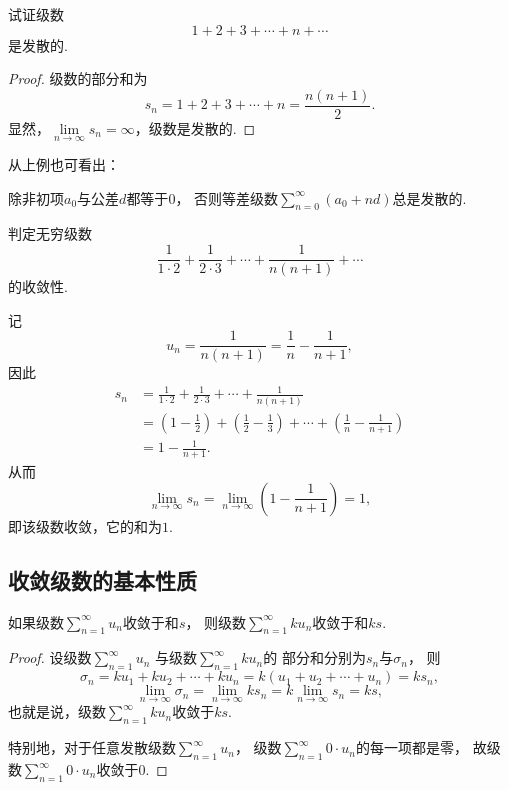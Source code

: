 \begin{example}\label{example:无穷级数.等差级数的收敛性}
试证级数\[
1+2+3+\dotsb+n+\dotsb
\]是发散的.
\begin{proof}
级数的部分和为\[
s_n = 1+2+3+\dotsb+n = \frac{n(n+1)}{2}.
\]显然，\(\lim\limits_{n\to\infty} s_n=\infty\)，级数是发散的.
\end{proof}
\end{example}
从上例也可看出：
\begin{proposition}
除非初项\(a_0\)与公差\(d\)都等于\(0\)，
否则等差级数\(\sum\limits_{n=0}^\infty(a_0+nd)\)总是发散的.
\end{proposition}

\begin{example}
判定无穷级数\[
\frac{1}{1\cdot2}+\frac{1}{2\cdot3}+\dotsb+\frac{1}{n(n+1)}+\dotsb
\]的收敛性.
\begin{solution}
记\[
	u_n = \frac{1}{n(n+1)} = \frac{1}{n}-\frac{1}{n+1},
\]
因此\begin{align*}
	s_n &= \frac{1}{1\cdot2}+\frac{1}{2\cdot3}+\dotsb+\frac{1}{n(n+1)} \\
	&= \left(1-\frac{1}{2}\right)+\left(\frac{1}{2}-\frac{1}{3}\right)
	+\dotsb+\left(\frac{1}{n}-\frac{1}{n+1}\right) \\
	&= 1-\frac{1}{n+1}.
\end{align*}
从而\[
	\lim\limits_{n\to\infty} s_n = \lim\limits_{n\to\infty} \left(1-\frac{1}{n+1}\right) = 1,
\]
即该级数收敛，它的和为\(1\).
\end{solution}
\end{example}

\subsection{收敛级数的基本性质}
\begin{property}\label{theorem:无穷级数.收敛级数性质1}
如果级数\(\sum\limits_{n=1}^\infty u_n\)收敛于和\(s\)，
则级数\(\sum\limits_{n=1}^\infty k u_n\)收敛于和\(ks\).
\begin{proof}
设级数\(\sum\limits_{n=1}^\infty u_n\)
与级数\(\sum\limits_{n=1}^\infty k u_n\)的
部分和分别为\(s_n\)与\(\sigma_n\)，
则\[
	\sigma_n
	= k u_1 + k u_2 + \dotsb + k u_n
	= k(u_1 + u_2 + \dotsb + u_n) = k s_n,
\]\[
	\lim\limits_{n\to\infty} \sigma_n
	= \lim\limits_{n\to\infty} k s_n
	= k \lim\limits_{n\to\infty} s_n = ks,
\]
也就是说，级数\(\sum\limits_{n=1}^\infty k u_n\)收敛于\(ks\).

特别地，对于任意发散级数\(\sum\limits_{n=1}^\infty u_n\)，
级数\(\sum\limits_{n=1}^\infty 0 \cdot u_n\)的每一项都是零，
故级数\(\sum\limits_{n=1}^\infty 0 \cdot u_n\)收敛于\(0\).
\end{proof}
\end{property}

